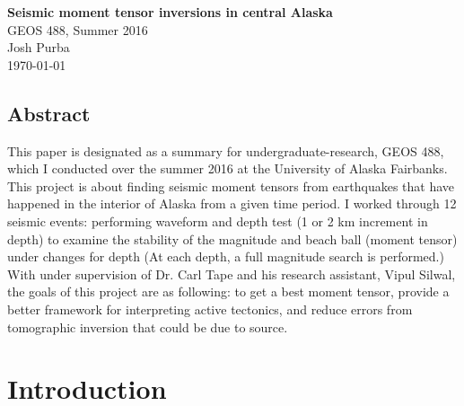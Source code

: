 \documentclass[11pt,titlepage,fleqn]{article}
\begin{document}

\begin{spacing}{1.0}
\noindent
{\bf \Large Seismic moment tensor inversions in central Alaska} \\
GEOS 488, Summer 2016 \\ 
Josh Purba \\
\today
\end{spacing}

\listoffigures

\normalsize

\subsection*{Abstract}


This paper is designated as a summary for undergraduate-research, GEOS 488,  which I conducted over the summer 2016 at the University of Alaska Fairbanks. This project is about finding seismic moment tensors from earthquakes that have happened in the interior of Alaska from a given time period. I worked through 12 seismic events: performing waveform and depth test (1 or 2 km increment in depth) to examine the stability of the magnitude and beach ball (moment tensor) under changes for depth (At each depth, a full magnitude search is performed.)
With under supervision of Dr. Carl Tape and his research assistant, Vipul Silwal, the goals of this project are as following: to get a best moment tensor, provide a better framework for interpreting active tectonics, and reduce errors from tomographic inversion that could be due to source.

\section{Introduction}
\label{sec:intro}

\end{document}
